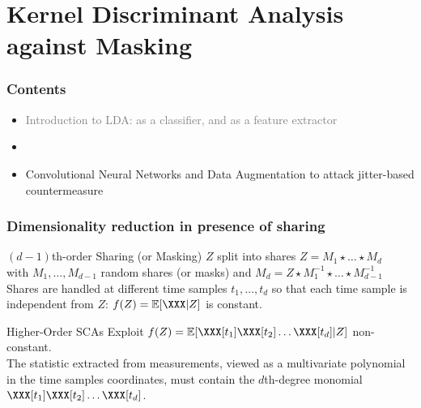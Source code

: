 \section{Kernel Discriminant Analysis against Masking}

\begin{frame}
\frametitle{Contents}
\begin{itemize}
\item \textcolor{grey}{Introduction to LDA: as a classifier, and as a feature extractor}
\item {}
\item Convolutional Neural Networks and Data Augmentation to attack jitter-based countermeasure
\end{itemize}
\end{frame}

\begin{frame}
\frametitle{Dimensionality reduction in presence of sharing}

\begin{block}{$(d-1)$th-order Sharing (or Masking)}
$Z$ split into shares  $Z = M_1 \star \dots \star M_d$ \\
with $M_1, \dots , M_{d-1}$ random shares (or masks) and $M_d = Z \star M_1^{-1}\star \dots \star M_{d-1}^{-1}$ \\
Shares are handled at different time samples $t_1,\dots, t_d$ so that each time sample is independent from $Z$: $f(Z) = \esper[\XXX\lvert Z]$ is constant.
\end{block}
\pause
\begin{block}{Higher-Order SCAs}
Exploit $f(Z) = \esper[\XXX[t_1]\XXX[t_2]\dots\XXX[t_d]\lvert Z]$ non-constant.\\
 
The statistic extracted from measurements, viewed as a multivariate polynomial in the time samples coordinates, must contain the $d$th-degree monomial $\XXX[t_1]\XXX[t_2]\dots\XXX[t_d]$.
\end{block}

\end{frame}

